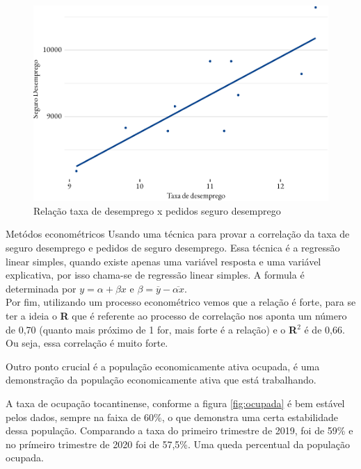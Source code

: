 \begin{figure}[h]
	\caption{Relação taxa de desemprego x pedidos seguro desemprego}
	\includegraphics[width=\linewidth]{fig/reg_emprego-2.pdf}
\end{figure}
\begin{smbox}[label={labelbox},nameref={Desigualdade por gênero}]{Metódos econométricos}
	Usando uma técnica para provar a correlação da taxa de seguro desemprego e pedidos de seguro desemprego. Essa técnica é a regressão linear simples, quando existe apenas uma variável resposta e uma variável explicativa, por isso chama-se de regressão linear simples. A formula é determinada por $y = \alpha + \beta x$ e $\beta = \overline{y} - \overline{\alpha x}$.
	\\
	Por fim, utilizando um processo econométrico vemos que a relação é forte, para se ter a ideia o \textbf{R} que é referente ao processo de correlação nos aponta um número de 0,70 (quanto mais próximo de 1 for, mais forte é a relação) e o \textbf{R}$^{2}$ é de 0,66. Ou seja, essa correlação é muito forte.
\end{smbox}



\par Outro ponto crucial é a população economicamente ativa ocupada, é uma demonstração da população economicamente ativa que está trabalhando.



\par  A taxa de ocupação tocantinense, conforme a figura \ref{fig:ocupada} é bem estável pelos dados, sempre na faixa de 60\%, o que demonstra uma certa estabilidade dessa população. Comparando a taxa do primeiro trimestre de 2019, foi de 59\% e no prímeiro trimestre de 2020 foi de 57,5\%. Uma queda percentual da população ocupada.



